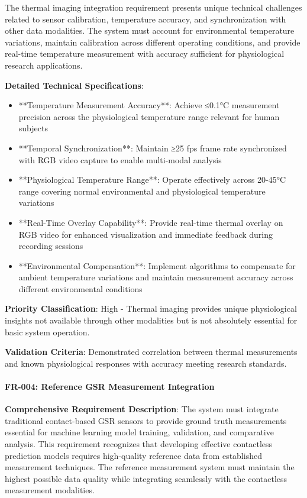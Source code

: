 \documentclass[11pt,a4paper]{report}
\begin{document}
The thermal imaging integration requirement presents unique technical challenges related to sensor calibration,
temperature accuracy, and synchronization with other data modalities. The system must account for environmental
temperature variations, maintain calibration across different operating conditions, and provide real-time temperature
measurement with accuracy sufficient for physiological research applications.

\textbf{Detailed Technical Specifications}:

\begin{itemize}
\item **Temperature Measurement Accuracy**: Achieve ≤0.1°C measurement precision across the physiological temperature range
  relevant for human subjects
\item **Temporal Synchronization**: Maintain ≥25 fps frame rate synchronized with RGB video capture to enable multi-modal
  analysis
\item **Physiological Temperature Range**: Operate effectively across 20-45°C range covering normal environmental and
  physiological temperature variations
\item **Real-Time Overlay Capability**: Provide real-time thermal overlay on RGB video for enhanced visualization and
  immediate feedback during recording sessions
\item **Environmental Compensation**: Implement algorithms to compensate for ambient temperature variations and maintain
  measurement accuracy across different environmental conditions

\end{itemize}
\textbf{Priority Classification}: High - Thermal imaging provides unique physiological insights not available through other
modalities but is not absolutely essential for basic system operation.

\textbf{Validation Criteria}: Demonstrated correlation between thermal measurements and known physiological responses with
accuracy meeting research standards.

\paragraph{FR-004: Reference GSR Measurement Integration}

\textbf{Comprehensive Requirement Description}: The system must integrate traditional contact-based GSR sensors to provide
ground truth measurements essential for machine learning model training, validation, and comparative analysis. This
requirement recognizes that developing effective contactless prediction models requires high-quality reference data from
established measurement techniques. The reference measurement system must maintain the highest possible data quality
while integrating seamlessly with the contactless measurement modalities.
\end{document}
